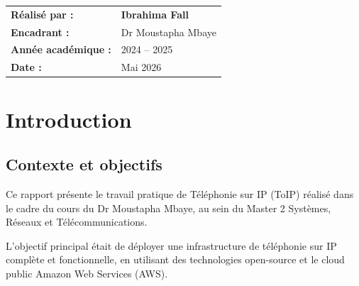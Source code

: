 \documentclass[a4paper,11pt]{report}
\begin{document}
\begin{titlepage}
\begin{center}
  \vspace{2cm}
  \begin{tabular}{ll}
    \color{white!70!gray}\textbf{Réalisé par :} & \color{white}\textbf{Ibrahima Fall}\\[6pt]
    \color{white!70!gray}\textbf{Encadrant :} & \color{white}Dr Moustapha Mbaye\\[6pt]
    \color{white!70!gray}\textbf{Année académique :} & \color{white}2024 -- 2025\\[6pt]
    \color{white!70!gray}\textbf{Date :} & \color{white}Mai 2026\\
  \end{tabular}
\end{center}
\end{titlepage}

\nopagecolor

\tableofcontents
\newpage

\chapter{Introduction}

\section{Contexte et objectifs}

Ce rapport présente le travail pratique de Téléphonie sur IP (ToIP) réalisé dans le cadre du cours du Dr Moustapha Mbaye, au sein du Master 2 Systèmes, Réseaux et Télécommunications.

L'objectif principal était de déployer une infrastructure de téléphonie sur IP complète et fonctionnelle, en utilisant des technologies open-source et le cloud public Amazon Web Services (AWS).
\end{document}
